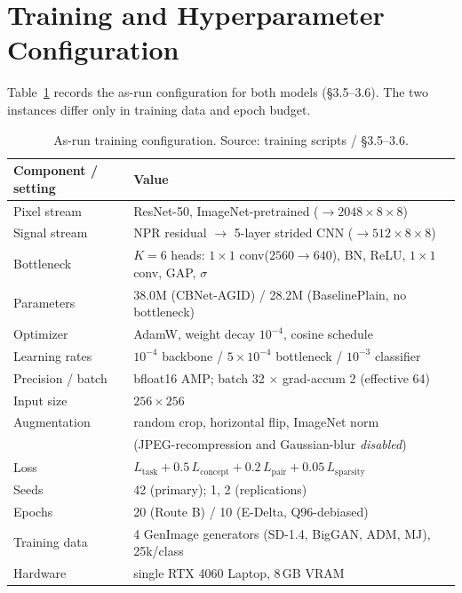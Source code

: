 \appendix

\section{Training and Hyperparameter Configuration}
\label{app:hyper}

Table~\ref{tab:hyper} records the as-run configuration for both models
(\S{}3.5--3.6). The two instances differ only in training data and epoch budget.

\begin{table}[h]
  \centering
  \caption{As-run training configuration. Source: training scripts / \S{}3.5--3.6.}
  \label{tab:hyper}
  \small
  \begin{tabular}{ll}
    \toprule
    Component / setting & Value \\
    \midrule
    Pixel stream            & ResNet-50, ImageNet-pretrained ($\to 2048{\times}8{\times}8$) \\
    Signal stream           & NPR residual $\to$ 5-layer strided CNN ($\to 512{\times}8{\times}8$) \\
    Bottleneck              & $K{=}6$ heads: $1{\times}1$ conv($2560{\to}640$), BN, ReLU, $1{\times}1$ conv, GAP, $\sigma$ \\
    Parameters              & 38.0M (CBNet-AGID) / 28.2M (BaselinePlain, no bottleneck) \\
    Optimizer               & AdamW, weight decay $10^{-4}$, cosine schedule \\
    Learning rates          & $10^{-4}$ backbone / $5\times10^{-4}$ bottleneck / $10^{-3}$ classifier \\
    Precision / batch       & bfloat16 AMP; batch 32 $\times$ grad-accum 2 (effective 64) \\
    Input size              & $256\times256$ \\
    Augmentation            & random crop, horizontal flip, ImageNet norm \\
                            & (JPEG-recompression and Gaussian-blur \emph{disabled}) \\
    Loss                    & $L_{\text{task}}+0.5\,L_{\text{concept}}+0.2\,L_{\text{pair}}+0.05\,L_{\text{sparsity}}$ \\
    Seeds                   & 42 (primary); 1, 2 (replications) \\
    Epochs                  & 20 (Route B) / 10 (E-Delta, Q96-debiased) \\
    Training data           & 4 GenImage generators (SD-1.4, BigGAN, ADM, MJ), 25k/class \\
    Hardware                & single RTX 4060 Laptop, 8\,GB VRAM \\
    \bottomrule
  \end{tabular}
\end{table}

